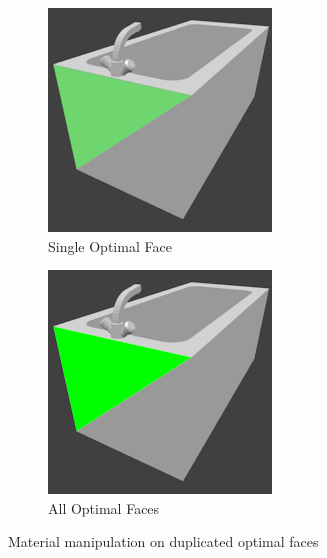 \begin{figure}
	\centering
	\begin{subfigure}{.49\textwidth}
		\centering
		\includegraphics[width=.7\textwidth]{images/optimal_face_single.png}
		\caption{Single Optimal Face}
		\label{fig:optimal-face-single}
	\end{subfigure}
	\begin{subfigure}{.49\textwidth}
		\centering
		\includegraphics[width=.7\textwidth]{images/optimal_face_all.png}
		\caption{All Optimal Faces}
		\label{fig:optimal-face-all}
	\end{subfigure}
	\caption{Material manipulation on duplicated optimal faces}
	\label{fig:optimal-face}
\end{figure}

